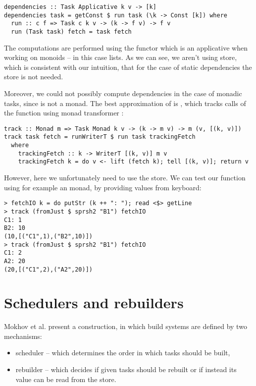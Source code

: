 \begin{lstlisting}
dependencies :: Task Applicative k v -> [k]
dependencies task = getConst $ run task (\k -> Const [k]) where
  run :: c f => Task c k v -> (k -> f v) -> f v
  run (Task task) fetch = task fetch
\end{lstlisting}

The computations are performed using the  functor which is an applicative when working on monoids -- in this case lists. As we can see, we aren't using store, which is consistent with our intuition, that for the case of static dependencies the store is not needed.

Moreover, we could not possibly compute dependencies in the case of monadic tasks, since  is not a monad. The best approximation of  is , which tracks calls of the  function using monad transformer :

\begin{lstlisting}
track :: Monad m => Task Monad k v -> (k -> m v) -> m (v, [(k, v)])
track task fetch = runWriterT $ run task trackingFetch
  where
    trackingFetch :: k -> WriterT [(k, v)] m v
    trackingFetch k = do v <- lift (fetch k); tell [(k, v)]; return v
\end{lstlisting}

However, here we unfortunately need to use the store. We can test our  function using for example an  monad, by providing values from keyboard:

\begin{lstlisting}
> fetchIO k = do putStr (k ++ ": "); read <$> getLine
> track (fromJust $ sprsh2 "B1") fetchIO
C1: 1
B2: 10
(10,[("C1",1),("B2",10)])
> track (fromJust $ sprsh2 "B1") fetchIO
C1: 2
A2: 20
(20,[("C1",2),("A2",20)])

\end{lstlisting}

\section{Schedulers and rebuilders}

Mokhov et al. present a construction, in which build systems are defined by two mechanisms:

\begin{itemize}
\item scheduler -- which determines the order in which tasks should be built,
\item rebuilder -- which decides if given tasks should be rebuilt or if instead its value can be read from the store.
\end{itemize}

